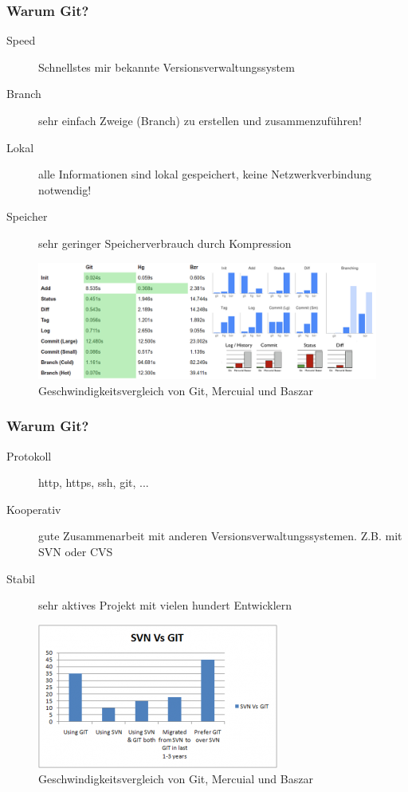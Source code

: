 \documentclass{beamer}
\begin{document}
\begin{frame}\frametitle{Warum Git?}
\begin{description}
\item[Speed] Schnellstes mir bekannte Versionsverwaltungssystem 
\item[Branch] sehr einfach Zweige (Branch) zu erstellen und zusammenzuführen!
\item[Lokal] alle Informationen sind lokal gespeichert, keine Netzwerkverbindung notwendig!
\item[Speicher] sehr geringer Speicherverbrauch durch Kompression
\end{description}

\begin{figure}
\includegraphics[scale=0.25]{Bilder/speed2} 
\caption{Geschwindigkeitsvergleich von Git, Mercuial und Baszar}
\end{figure}
\end{frame}

\begin{frame}\frametitle{Warum Git?}
\begin{description}
\item[Protokoll] http, https, ssh, git, ...
\item[Kooperativ] gute Zusammenarbeit mit anderen Versionsverwaltungssystemen. Z.B. mit SVN oder CVS
\item[Stabil] sehr aktives Projekt mit vielen hundert Entwicklern
\end{description}

\begin{figure}
\includegraphics[scale=0.5]{Bilder/svnvsgit1} 
\caption{Geschwindigkeitsvergleich von Git, Mercuial und Baszar}
\end{figure}
\end{frame}
\end{document}
